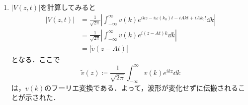 \documentclass[a4paper,pdflatex,ja=standard]{bxjsarticle}
\begin{document}
\begin{enumerate}
  \item 
  $|V(z,t)|$を計算してみると
  \begin{align}
    \nonumber
    \left|
      V(z,t)
    \right|
    &=
    \frac{1}{\sqrt{2\pi}}\left|
      \int_{-\infty}^{\infty}
      v(k)
      e^{ikz-i\omega(k_0)t-iAkt+iAk_0 t}
      \dd k
    \right|
    \\
    \nonumber
    &=
    \frac{1}{\sqrt{2\pi}}\left|
      \int_{-\infty}^{\infty}
      v(k)
      e^{i(z-At)k}
      \dd k
    \right|
    \\
    &=
    \left|
      \tilde{v}(z-At)
    \right|
  \end{align}
  となる．ここで
  \begin{equation}
    \tilde{v}(z)
    \coloneqq
    \frac{1}{\sqrt{2\pi}}
    \int_{-\infty}^{\infty}
      v(k)
      e^{ikz}
      \dd k
  \end{equation}
  は，$v(k)$のフーリエ変換である．よって，波形が変化せずに伝搬されることが示された．
\end{enumerate}
\end{document}

